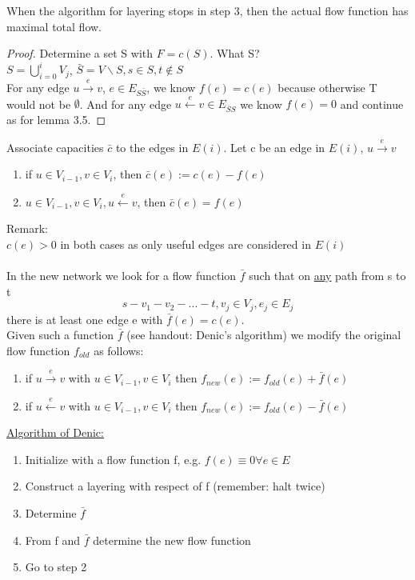 \begin{theorem}
When the algorithm for layering stops in step 3, then the actual flow function has maximal total flow.
\end{theorem}

\begin{proof}
Determine a set S with $F = c(S)$. What S? \\
$ S = \bigcup_{i=0}^i V_j$, $\bar{S} = V \backslash S, s \in S, t \notin S$ \\ 
For any edge $ u \xrightarrow{e} v$, $e \in E_{S\bar{S}}$, we know $f(e) = c(e)$ because otherwise T would not be $\emptyset$. And for any edge $u \xleftarrow{e} v \in E_{\bar{S}S}$ we know $f(e) = 0$ and continue as for lemma 3.5.
\end{proof}

\begin{definition}
Associate capacities $\bar{c}$ to the edges in $E(i)$. Let c be an edge in $E(i)$, $ u \xrightarrow{e} v$ 
\begin{enumerate}
\item if $ u \in V_{i-1}, v \in V_i$, then $\bar{c}(e) := c(e) - f(e)$
\item $u \in V_{i-1}, v \in V_i, u \xleftarrow{e} v$, then $\bar{c}(e) = f(e)$
\end{enumerate}
Remark: \\
$c(e) > 0 $ in both cases as only useful edges are considered in $E(i)$ \\ \\

In the new network we look for a flow function $\bar{f}$ such that on \underline{any} path from s to t 
\[s - v_1 - v_2 - ... - t, v_j \in V_j, e_j \in E_j\]
there is at least one edge e with $\bar{f}(e) = c(e)$. \\
Given such a function $\bar{f}$ (see handout: Denic's algorithm) we modify the original flow function $f_{old}$ as follows:
\begin{enumerate}
\item if $u \xrightarrow{e} v$ with $u \in V_{i-1}, v \in V_i$ then $f_{new}(e) := f_{old}(e) + \bar{f}(e)$
\item if $u \xleftarrow{e} v$ with $u \in V_{i-1}, v \in V_i$ then $f_{new}(e) := f_{old}(e) - \bar{f}(e) $
\end{enumerate}
\underline{Algorithm of Denic:} \\
\begin{enumerate}
\item Initialize with a flow function f, e.g. $f(e) \equiv 0 \forall e \in E$
\item Construct a layering with respect of f (remember: halt twice)
\item Determine $\bar{f}$
\item From f and $\bar{f}$ determine the new flow function
\item Go to step 2
\end{enumerate}
\end{definition}

